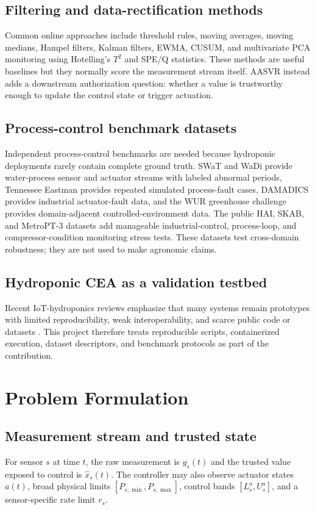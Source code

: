 \documentclass[preprint,12pt]{elsarticle}
\begin{document}
\subsection{Filtering and data-rectification methods}
Common online approaches include threshold rules, moving averages, moving medians, Hampel filters, Kalman filters, EWMA, CUSUM, and multivariate PCA monitoring using Hotelling's $T^2$ and SPE/Q statistics. These methods are useful baselines but they normally score the measurement stream itself. AASVR instead adds a downstream authorization question: whether a value is trustworthy enough to update the control state or trigger actuation.

\subsection{Process-control benchmark datasets}
Independent process-control benchmarks are needed because hydroponic deployments rarely contain complete ground truth. SWaT and WaDi provide water-process sensor and actuator streams with labeled abnormal periods, Tennessee Eastman provides repeated simulated process-fault cases, DAMADICS provides industrial actuator-fault data, and the WUR greenhouse challenge provides domain-adjacent controlled-environment data. The public HAI, SKAB, and MetroPT-3 datasets add manageable industrial-control, process-loop, and compressor-condition monitoring stress tests. These datasets test cross-domain robustness; they are not used to make agronomic claims.

\subsection{Hydroponic CEA as a validation testbed}
Recent IoT-hydroponics reviews emphasize that many systems remain prototypes with limited reproducibility, weak interoperability, and scarce public code or datasets \cite{beyondprototypes2025}. This project therefore treats reproducible scripts, containerized execution, dataset descriptors, and benchmark protocols as part of the contribution.

\section{Problem Formulation}
\subsection{Measurement stream and trusted state}
For sensor $s$ at time $t$, the raw measurement is $y_s(t)$ and the trusted value exposed to control is $\hat{x}_s(t)$. The controller may also observe actuator states $a(t)$, broad physical limits $[P_{s,\min}, P_{s,\max}]$, control bands $[L^a_s,U^a_s]$, and a sensor-specific rate limit $r_s$.
\end{document}

